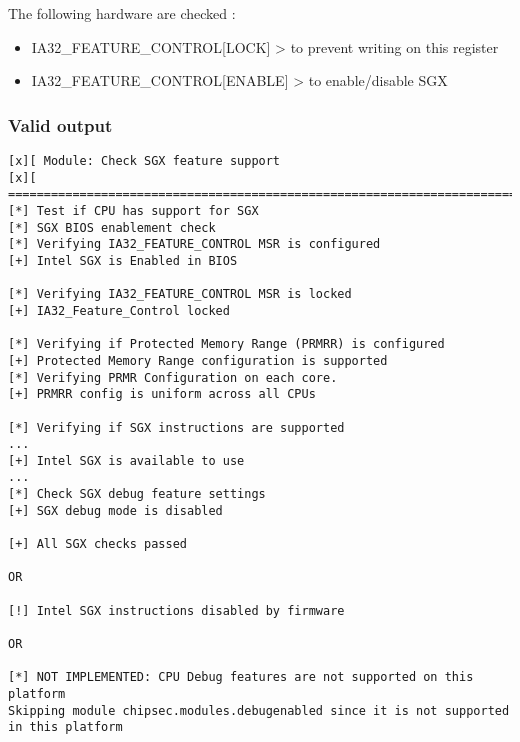 The following hardware are checked :

\begin{itemize}
\tightlist
\item
  IA32\_FEATURE\_CONTROL{[}LOCK{]} \textgreater{} to prevent writing on
  this register
\item
  IA32\_FEATURE\_CONTROL{[}ENABLE{]} \textgreater{} to enable/disable
  SGX
\end{itemize}

\hypertarget{valid-output-22}{%
\subsubsection{Valid output}\label{valid-output-22}}

\begin{verbatim}
[x][ Module: Check SGX feature support
[x][ =======================================================================
[*] Test if CPU has support for SGX
[*] SGX BIOS enablement check
[*] Verifying IA32_FEATURE_CONTROL MSR is configured
[+] Intel SGX is Enabled in BIOS

[*] Verifying IA32_FEATURE_CONTROL MSR is locked
[+] IA32_Feature_Control locked

[*] Verifying if Protected Memory Range (PRMRR) is configured
[+] Protected Memory Range configuration is supported
[*] Verifying PRMR Configuration on each core.
[+] PRMRR config is uniform across all CPUs

[*] Verifying if SGX instructions are supported
...
[+] Intel SGX is available to use
...
[*] Check SGX debug feature settings
[+] SGX debug mode is disabled

[+] All SGX checks passed

OR

[!] Intel SGX instructions disabled by firmware

OR 

[*] NOT IMPLEMENTED: CPU Debug features are not supported on this platform
Skipping module chipsec.modules.debugenabled since it is not supported in this platform
\end{verbatim}
